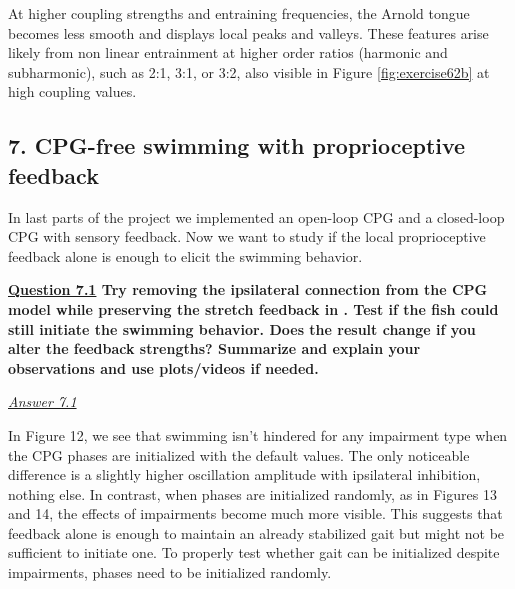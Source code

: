 \documentclass{cmc}
\begin{document}
At higher coupling strengths and entraining frequencies, the Arnold tongue becomes less smooth and displays local peaks and valleys. These features arise likely from non linear entrainment at higher order ratios (harmonic and subharmonic), such as 2:1, 3:1, or 3:2, also visible in Figure \ref{fig:exercise62b} at high coupling values. 

\subsection*{7. CPG-free swimming with proprioceptive feedback}

In last parts of the project we implemented an open-loop CPG and a closed-loop CPG with sensory feedback. Now we want to study if the local proprioceptive feedback alone is enough to elicit the swimming behavior.

\textbf{\underline{Question 7.1} Try removing the ipsilateral connection from the CPG model while preserving the stretch feedback in . Test if the fish could still initiate the swimming behavior. Does the result change if you alter the feedback strengths? Summarize and explain your observations and use plots/videos if needed.}

\textit{\underline{Answer 7.1}}

In Figure 12, we see that swimming isn’t hindered for any impairment type when the CPG phases are initialized with the default values. The only noticeable difference is a slightly higher oscillation amplitude with ipsilateral inhibition, nothing else. In contrast, when phases are initialized randomly, as in Figures 13 and 14, the effects of impairments become much more visible. This suggests that feedback alone is enough to maintain an already stabilized gait but might not be sufficient to initiate one. To properly test whether gait can be initialized despite impairments, phases need to be initialized randomly.
\end{document}

